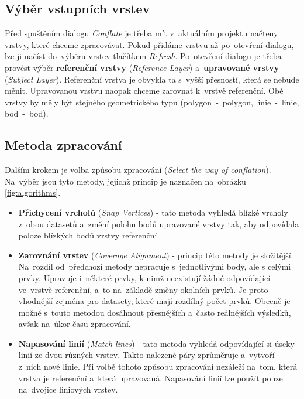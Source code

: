 \subsection{Výběr vstupních vrstev}
Před spuštěním dialogu \textit{Conflate} je třeba mít v~aktuálním projektu 
načteny vrstvy, které chceme zpracovávat. Pokud přidáme vrstvu až po~otevření
dialogu, lze ji načíst do~výběru vrstev tlačítkem \textit{Refresh}.
Po~otevření dialogu je třeba provést výběr \textbf{re\-ferenční vrstvy} 
(\textit{Reference Layer}) a~\textbf{upravované vrstvy} (\textit{Subject Layer}). 
Re\-ferenční vrstva je obvykla ta s~vyšší přesností, která se nebude měnit. 
Upravovanou vrstvu naopak chceme zarovnat k~vrstvě referenční. 
Obě vrstvy by měly být stejného geometrického typu (polygon~-~polygon, 
linie~-~linie, bod~-~bod).

\subsection{Metoda zpracování}
Dalším krokem je volba způsobu zpracování (\textit{Select the way of conflation}). 
Na~výběr jsou tyto metody, jejichž princip je naznačen na~obrázku \ref{fig:algorithms}.

\begin{itemize}
 \item \textbf{Přichycení vrcholů} (\textit{Snap Vertices}) - tato metoda vyhledá 
	blízké vrcholy z~obou datasetů a~změní polohu bodů upravované vrstvy tak, 
	aby odpovídala poloze blízkých bodů vrstvy referenční.
 \item \textbf{Zarovnání vrstev} (\textit{Coverage Alignment}) - princip této 
	metody je složitější. Na~rozdíl od~předchozí metody nepracuje s~jednotlivými
	body, ale s celými prvky. Upravuje i~některé prvky, k nimž neexistují 
	žádné odpovídající ve~vrstvě refe\-renční, a~to na~základě změny okolních 
	prvků. Je proto vhodnější zejména pro datasety, které mají rozdílný počet
	prvků. Obecně je možné s~touto metodou dosáhnout přesnějších a~často
	reálnějších výsledků, avšak na~úkor času zpraco\-vání.
 \item \textbf{Napasování linií} (\textit{Match lines}) - tato metoda vyhledá
	odpovídající si úseky linií ze dvou různých vrstev. Takto nalezené
	páry zprůměruje a~vytvoří z~nich nové linie. Při volbě tohoto způsobu
	zpracování nezáleží na~tom, která vrstva je referenční a~která upravovaná.
	Napasování linií lze použít pouze na~dvojice liniových vrstev.
\end{itemize}

